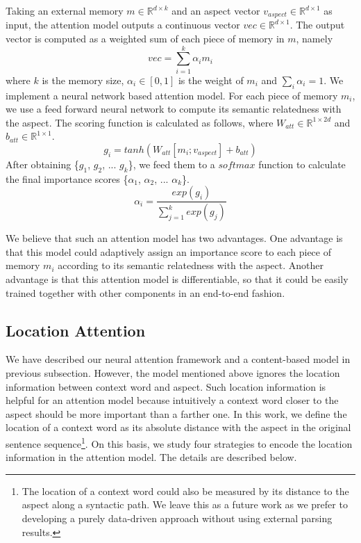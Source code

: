 \documentclass[11pt,letterpaper]{article}
\begin{document}
Taking an external memory $m \in \mathbb{R}^{d \times k}$ and an aspect vector $v_{aspect} \in \mathbb{R}^{d \times 1}$ as input, the attention model outputs a continuous vector $vec \in \mathbb{R}^{d \times 1}$.
The output vector is computed as a weighted sum of each piece of memory in $m$, namely 
\begin{equation}
vec = \sum_{i=1}^{k}\alpha_i m_i
\end{equation}
where $k$ is the memory size, $\alpha_i \in [0,1]$ is the weight of $m_i$ and $\sum_{i} \alpha_i = 1$.
We implement a neural network based attention model.
For each piece of memory $m_i$, we use a feed forward neural network to compute its semantic relatedness with the aspect. The scoring function is calculated as follows, where $W_{att} \in \mathbb{R}^{1 \times 2d}$ and $b_{att} \in \mathbb{R}^{1 \times 1}$.
\begin{equation}
	g_i = tanh(W_{att} [m_i; v_{aspect}] + b_{att})
\end{equation}
After obtaining \{$g_1$, $g_2$, ... $g_k$\}, we feed them to a $softmax$ function to calculate the final importance scores \{$\alpha_1$, $\alpha_2$, ... $\alpha_k$\}.
\begin{equation}
	\alpha_i = \frac{exp(g_i)}{\sum_{j=1}^k exp(g_{j})}
\end{equation}

We believe that such an attention model has two advantages. 
One advantage is that this model could adaptively assign an importance score to each piece of memory $m_i$ according to its semantic relatedness with the aspect.
Another advantage is that this attention model is differentiable, so that it could be easily trained together with other components in an end-to-end fashion. 

\subsection{Location Attention}\label{section:location-attention}
We have described our neural attention framework and a content-based model in previous subsection. 
However, the model mentioned above 
ignores the location information between context word and aspect. 
Such location information is helpful for an attention model because intuitively a context word closer to the aspect should be more important than a farther one.
In this work, we define the location of a context word as its absolute distance with the aspect in the original sentence sequence\footnote{The location of a context word could also be measured by its distance to the aspect along a syntactic path. We leave this as a future work as we prefer to developing a purely data-driven approach without using external parsing results.}.
On this basis, we study four strategies to encode the location information in the attention model.
The details are described below.
\end{document}
